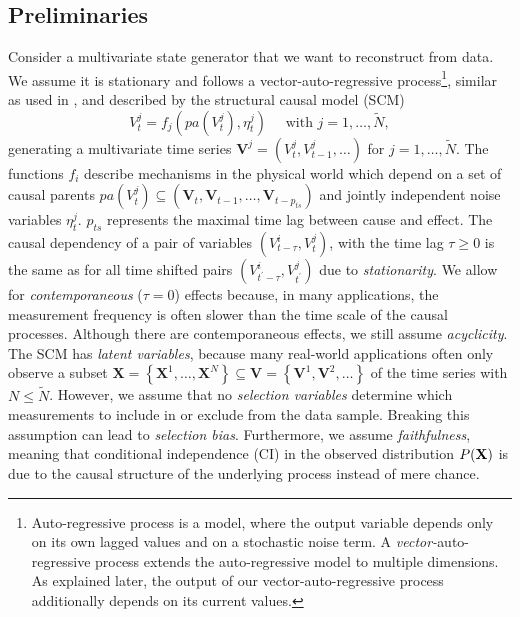 \documentclass[conference]{IEEEtran}
\begin{document}
\subsection{Preliminaries}
Consider a multivariate state generator that we want to reconstruct from data.
We assume it is stationary and follows a vector-auto-regressive process\footnote{Auto-regressive process is a model, where the output variable depends only on its own lagged values and on a stochastic noise term. A \textit{vector-}auto-regressive process extends the auto-regressive model to multiple dimensions. As explained later, the output of our vector-auto-regressive process additionally depends on its current values.}, similar as used in \cite{gerhardus_high-recall_2021}, and described by the structural causal model (SCM)
\begin{equation}
V_{t}^{j}=f_{j}\left(pa\left(V_{t}^{j}\right), \eta_{t}^{j}\right) \quad \text { with } j=1, \ldots, \tilde{N},
\end{equation}
generating a multivariate time series $\mathbf{V}^{j}=\left(V_{t}^{j}, V_{t-1}^{j}, \ldots\right)$ for $j=1, \ldots, \tilde{N}$.
The functions $f_i$ describe mechanisms in the physical world which depend on a set of causal parents $p a\left(V_{t}^{j}\right) \subseteq\left(\mathbf{V}_{t}, \mathbf{V}_{t-1}, \ldots, \mathbf{V}_{t-p_{t s}}\right)$ and jointly independent noise variables $\eta_{t}^{j}$. $p_{t s}$ represents the maximal time lag between cause and effect.
The causal dependency of a pair of variables $\left(V_{t-\tau}^{i}, V_{t^{}}^{j}\right)$, with the time lag $\tau \geq 0$ is the same as for all time shifted pairs $\left(V_{t^{\prime}-\tau}^{i}, V_{t^{\prime}}^{j}\right)$ due to \textit{stationarity}.
We allow for \textit{contemporaneous} ($\tau=0$) effects because, in many applications, the measurement frequency is often slower than the time scale of the causal processes. Although there are contemporaneous effects, we still assume \textit{acyclicity}.
The SCM has \textit{latent variables}, because many real-world applications often only observe a subset $\mathbf{X}=\left\{\mathbf{X}^{1}, \ldots, \mathbf{X}^{N}\right\} \subseteq \mathbf{V}=\left\{\mathbf{V}^{1}, \mathbf{V}^{2}, \ldots\right\}$ of the time series with $N \leq \tilde{N}$. 
However, we assume that no \textit{selection variables} determine which measurements to include in or exclude from the data sample. Breaking this assumption can lead to \textit{selection bias}.
Furthermore, we assume \textit{faithfulness}, meaning that conditional independence (CI) in the observed distribution $P(\bf{X})$ is due to the causal structure of the underlying process instead of mere chance\cite{gerhardus_high-recall_2021}.
\end{document}
